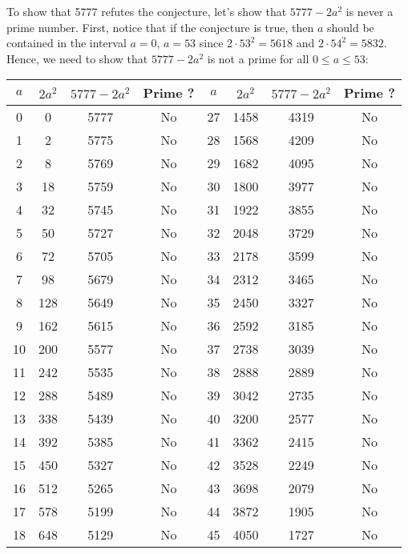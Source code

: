 \begin{solution}
    To show that 5777 refutes the conjecture, let's show that $5777 - 2a^2$ is never a prime number. First, notice that if the conjecture is true, then $a$ should be contained in the interval $a = 0$, $a = 53$ since $2 \cdot 53^2 = 5618$ and $2 \cdot 54^2 = 5832$. Hence, we need to show that $5777 - 2a^2$ is not a prime for all $0 \leq a \leq 53$:
    \begin{center}
    \begin{tabular}{ |c|c|c|c|c|c|c|c| }
        \hline $a$ & $2a^2$ & $5777 - 2a^2$ & Prime ? & $a$ & $2a^2$ & $5777 - 2a^2$ & Prime ? \\
        \hline 0 & 0 & 5777 & No & 27 & 1458 & 4319 & No \\
        \hline 1 & 2 & 5775 & No & 28 & 1568 & 4209 & No \\
        \hline 2 & 8 & 5769 & No & 29 & 1682 & 4095 & No \\
        \hline 3 & 18 & 5759 & No & 30 & 1800 & 3977 & No \\
        \hline 4 & 32 & 5745 & No & 31 & 1922 & 3855 & No \\
        \hline 5 & 50 & 5727 & No & 32 & 2048 & 3729 & No \\
        \hline 6 & 72 & 5705 & No & 33 & 2178 & 3599 & No \\
        \hline 7 & 98 & 5679 & No & 34 & 2312 & 3465 & No \\
        \hline 8 & 128 & 5649 & No & 35 & 2450 & 3327 & No \\
        \hline 9 & 162 & 5615 & No & 36 & 2592 & 3185 & No \\
        \hline 10 & 200 & 5577 & No & 37 & 2738 & 3039 & No \\
        \hline 11 & 242 & 5535 & No & 38 & 2888 & 2889 & No \\
        \hline 12 & 288 & 5489 & No & 39 & 3042 & 2735 & No \\
        \hline 13 & 338 & 5439 & No & 40 & 3200 & 2577 & No \\
        \hline 14 & 392 & 5385 & No & 41 & 3362 & 2415 & No \\
        \hline 15 & 450 & 5327 & No & 42 & 3528 & 2249 & No\\
        \hline 16 & 512 & 5265 & No & 43 & 3698 & 2079 & No \\
        \hline 17 & 578 & 5199 & No & 44 & 3872 & 1905 & No \\
        \hline 18 & 648 & 5129 & No & 45 & 4050 & 1727 & No \\

\end{tabular}
\end{center}
\end{solution}
